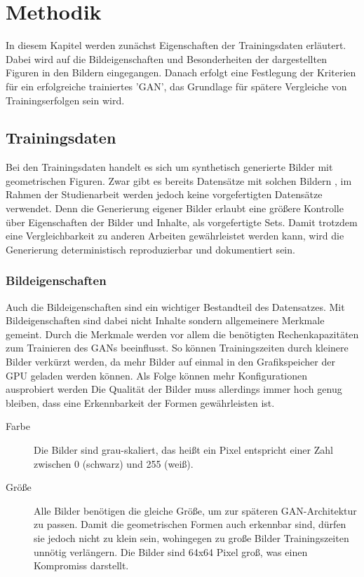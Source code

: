 \chapter{Methodik}
In diesem Kapitel werden zunächst Eigenschaften der Trainingsdaten erläutert.
Dabei wird auf die Bildeigenschaften und Besonderheiten der dargestellten Figuren in den Bildern eingegangen.
Danach erfolgt eine Festlegung der Kriterien für ein erfolgreiche trainiertes 'GAN', das Grundlage für spätere Vergleiche von Trainingserfolgen sein wird.

\section{Trainingsdaten}
Bei den Trainingsdaten handelt es sich um synthetisch generierte Bilder mit geometrischen Figuren.
Zwar gibt es bereits Datensätze mit solchen Bildern \cite{dataset:four-shapes, dataset:2d-geometric-shapes-dataset}, im Rahmen der Studienarbeit werden jedoch keine vorgefertigten Datensätze verwendet.
Denn die Generierung eigener Bilder erlaubt eine größere Kontrolle über Eigenschaften der Bilder und Inhalte, als vorgefertigte Sets.
Damit trotzdem eine Vergleichbarkeit zu anderen Arbeiten gewährleistet werden kann, wird die Generierung deterministisch reproduzierbar und dokumentiert sein.

\subsection{Bildeigenschaften}
Auch die Bildeigenschaften sind ein wichtiger Bestandteil des Datensatzes.
Mit Bildeigenschaften sind dabei nicht Inhalte sondern allgemeinere Merkmale gemeint.
Durch die Merkmale werden vor allem die benötigten Rechenkapazitäten zum Trainieren des GANs beeinflusst.
So können Trainingszeiten durch kleinere Bilder verkürzt werden, da mehr Bilder auf einmal in den Grafikspeicher der GPU geladen werden können.
Als Folge können mehr Konfigurationen ausprobiert werden
Die Qualität der Bilder muss allerdings immer hoch genug bleiben, dass eine Erkennbarkeit der Formen gewährleisten ist.

\begin{description}
	\item[Farbe]
	Die Bilder sind grau-skaliert, das heißt ein Pixel entspricht einer Zahl zwischen 0 (schwarz) und 255 (weiß).
	
	\item[Größe]
	Alle Bilder benötigen die gleiche Größe, um zur späteren GAN-Architektur zu passen.
	Damit die geometrischen Formen auch erkennbar sind, dürfen sie jedoch nicht zu klein sein, wohingegen zu große Bilder Trainingszeiten unnötig verlängern.
	Die Bilder sind 64x64 Pixel groß, was einen Kompromiss darstellt.
\end{description}

